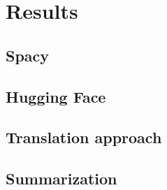 \chapter{Results}
\label{cha:results}
\section{Spacy}
\section{Hugging Face}
\section{Translation approach}
\section{Summarization}